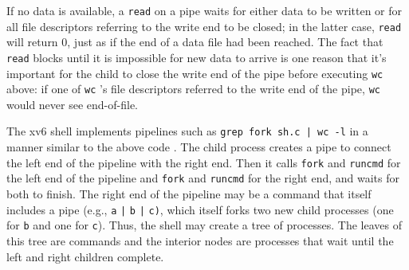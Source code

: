 If no data is available, a
\lstinline{read}
on a pipe waits for either data to be written or for all
file descriptors referring to the write end to be closed;
in the latter case,
\lstinline{read}
will return 0, just as if the end of a data file had been reached.
The fact that
\lstinline{read}
blocks until it is impossible for new data to arrive
is one reason that it's important for the child to
close the write end of the pipe
before executing
\lstinline{wc}
above: if one of
\lstinline{wc} 's
file descriptors referred to the write end of the pipe,
\lstinline{wc}
would never see end-of-file.

The xv6 shell implements pipelines such as
\lstinline{grep fork sh.c | wc -l}
in a manner similar to the above code
.
The child process creates a pipe to connect the left end of the pipeline
with the right end. Then it calls
\lstinline{fork}
and
\lstinline{runcmd}
for the left end of the pipeline
and 
\lstinline{fork}
and
\lstinline{runcmd}
for the right end, and waits for both to finish.
The right end of the pipeline may be a command that itself includes a
pipe (e.g.,
\lstinline{a}
\lstinline{|}
\lstinline{b}
\lstinline{|}
\lstinline{c)}, 
which itself forks two new child processes (one for
\lstinline{b}
and one for
\lstinline{c}).
Thus, the shell may
create a tree of processes.  The leaves of this tree are commands and
the interior nodes are processes that wait until the left and right
children complete.


